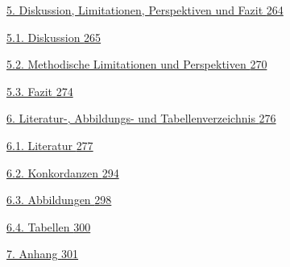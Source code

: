 \hyperref[diskussion-limitationen-perspektiven-und-fazit]{5. Diskussion, Limitationen, Perspektiven und Fazit \hyperref[diskussion-limitationen-perspektiven-und-fazit]{264}}

\hyperref[diskussion]{5.1. Diskussion \hyperref[diskussion]{265}}

\hyperref[methodische-limitationen-und-perspektiven]{5.2. Methodische Limitationen und Perspektiven \hyperref[methodische-limitationen-und-perspektiven]{270}}

\hyperref[fazit-8]{5.3. Fazit \hyperref[fazit-8]{274}}

\hyperref[literatur--abbildungs--und-tabellenverzeichnis]{6. Literatur-, Abbildungs- und Tabellenverzeichnis \hyperref[literatur--abbildungs--und-tabellenverzeichnis]{276}}

\hyperref[literatur]{6.1. Literatur \hyperref[literatur]{277}}

\hyperref[konkordanzen]{6.2. Konkordanzen \hyperref[konkordanzen]{294}}

\hyperref[abbildungen]{6.3. Abbildungen \hyperref[abbildungen]{298}}

\hyperref[tabellen]{6.4. Tabellen \hyperref[tabellen]{300}}

\hyperref[anhang]{7. Anhang \hyperref[anhang]{301}}